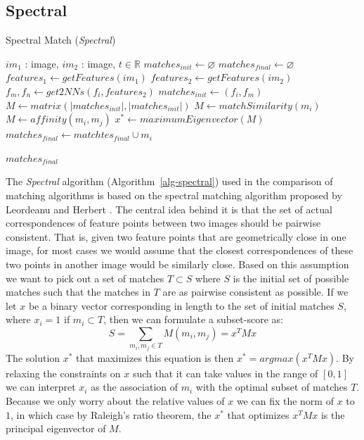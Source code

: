 \subsection{Spectral}

\begin{algorithm}[h]
\caption{Spectral Match (\emph{Spectral})}
\label{alg-spectral}
\begin{algorithmic}
\Require $im_1$ : image, $im_2$ : image, $t \in \mathbb{R}$
\State $matches_{init}\gets \varnothing$
\State $matches_{final} \gets \varnothing$
\State $features_1 \gets getFeatures(im_1)$
\State $features_2 \gets getFeatures(im_2)$
	\State $f_m,f_n \gets get2NNs(f_i, features_2)$
	\State $matches_{init} \gets \left(f_i, f_m\right)$
\EndFor
\State $M \gets matrix(\left\vert matches_{init} \right\vert, \left\vert 
matches_{init} \right\vert)$
			\State $M \gets matchSimilarity(m_i)$
		\Else
			\State $M \gets affinity(m_i, m_j)$
		\EndIf
	\EndFor
\EndFor
\State $x^{*} \gets maximumEigenvector(M)$
		\State $matches_{final} \gets matchtes_{final} \cup m_i$
	\EndIf
\EndFor

\Return $matches_{final}$
\end{algorithmic}
\end{algorithm}

The \emph{Spectral} algorithm (Algorithm~\ref{alg-spectral}) used in the 
comparison of matching algorithms is based on the spectral matching 
algorithm proposed by Leordeanu and Herbert 
\cite{leordeanu2005spectral}.  The central idea behind it is that the 
set of actual correspondences of feature points between two images 
should be pairwise consistent. That is, given two feature points that 
are geometrically close in one image, for most cases we would assume 
that the closest correspondences of these two points in another image 
would be similarly close.  Based on this assumption we want to pick out 
a set of matches $T \subset S$ where $S$ is the initial set of possible 
matches such that the matches in $T$ are as pairwise consistent as 
possible. If we let $x$ be a binary vector corresponding in length to 
the set of initial matches $S$, where $x_i = 1$ if $m_i \subset T$, then 
we can formulate a subset-score as:
\begin{equation*}
	S = \sum_{m_i, m_j \in T} M(m_i, m_j) = x^TMx
\end{equation*}
The solution $x^{*}$ that maximizes this equation is then $x^{*} = 
argmax(x^TMx)$. By relaxing the constraints on $x$ such that it can take
values in the range of $\left[0, 1\right]$ we can interpret $x_i$ as the
association of $m_i$ with the optimal subset of matches $T$. Because we 
only worry about the relative values of $x$ we can fix the norm of $x$ 
to $1$, in which case by Raleigh's ratio theorem, the $x^{*}$ that 
optimizes $x^TMx$ is the principal eigenvector of $M$.

